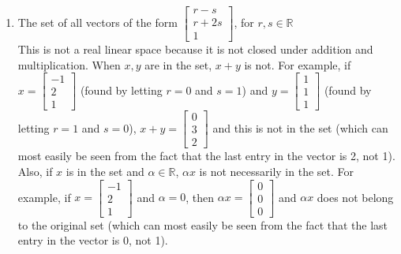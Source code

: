 \documentclass[11pt]{amsart}
\theoremstyle{plain}
\theoremstyle{definition}
\begin{document}
\begin{enumerate}
\begin{enumerate}
\item The set of all vectors of the form $\left[\begin{array}{c}
r-s\\
r+2s\\
1
\end{array}\right]$, for $r,s\in\mathbb{R}$ \\
This is not a real linear space because it is not closed under addition and multiplication. When $x, y$ are in the set, $x + y$ is not. For example, if $x = \begin{bmatrix} -1 \\ 2 \\ 1 \end{bmatrix}$ (found by letting $r = 0$ and $s = 1$) and $y = \begin{bmatrix} 1 \\ 1 \\ 1 \end{bmatrix}$ (found by letting $r = 1$ and $s = 0$), $x + y = \begin{bmatrix} 0 \\ 3 \\ 2 \end{bmatrix}$ and this is not in the set (which can most easily be seen from the fact that the last entry in the vector is 2, not 1). Also, if $x$ is in the set and $\alpha \in \mathbb{R}$, $\alpha x$ is not necessarily in the set. For example, if $x = \begin{bmatrix} -1 \\ 2 \\ 1 \end{bmatrix}$ and $\alpha = 0$, then $\alpha x = \begin{bmatrix} 0 \\ 0 \\ 0 \end{bmatrix}$ and $\alpha x$ does not belong to the original set (which can most easily be seen from the fact that the last entry in the vector is 0, not 1). \\


\end{enumerate}
\end{enumerate}
\end{document}
